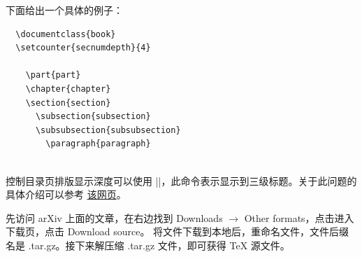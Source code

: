 下面给出一个具体的例子：

\begin{verbatim}
  \documentclass{book}
  \setcounter{secnumdepth}{4}
  
    \part{part}
    \chapter{chapter}
    \section{section}
      \subsection{subsection}
      \subsubsection{subsubsection}
        \paragraph{paragraph}
  
\end{verbatim}

控制目录页排版显示深度可以使用 |\setcounter{tocdepth}{2}|，此命令表示显示到三级标题。关于此问题的具体介绍可以参考
\href{https://blog.csdn.net/RobertChenGuangzhi/article/details/50480856}{该网页}。


先访问 arXiv 上面的文章，在右边找到 Downloads $\rightarrow$ Other formats，点击进入下载页，点击 Download source。
将文件下载到本地后，重命名文件，文件后缀名是 .tar.gz。接下来解压缩 .tar.gz 文件，即可获得 \TeX{} 源文件。


